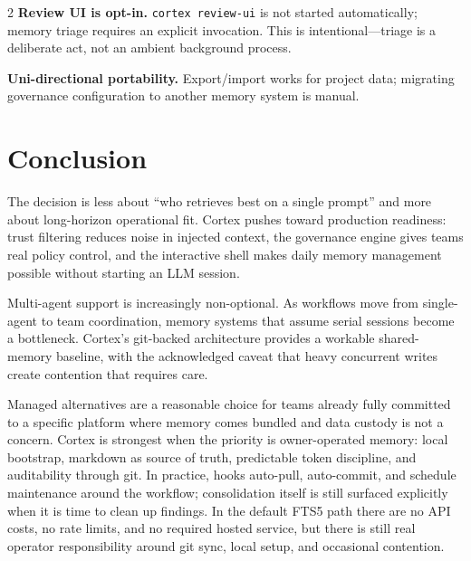 \documentclass[10pt]{article}
\begin{document}
\begin{multicols}{2}
\textbf{Review UI is opt-in.} \texttt{cortex review-ui} is not started automatically; memory triage requires an explicit invocation. This is intentional---triage is a deliberate act, not an ambient background process.

\textbf{Uni-directional portability.} Export/import works for project data; migrating governance configuration to another memory system is manual.

\section{Conclusion}
The decision is less about ``who retrieves best on a single prompt'' and more about long-horizon operational fit. Cortex pushes toward production readiness: trust filtering reduces noise in injected context, the governance engine gives teams real policy control, and the interactive shell makes daily memory management possible without starting an LLM session.

Multi-agent support is increasingly non-optional. As workflows move from single-agent to team coordination, memory systems that assume serial sessions become a bottleneck. Cortex's git-backed architecture provides a workable shared-memory baseline, with the acknowledged caveat that heavy concurrent writes create contention that requires care.

Managed alternatives are a reasonable choice for teams already fully committed to a specific platform where memory comes bundled and data custody is not a concern. Cortex is strongest when the priority is owner-operated memory: local bootstrap, markdown as source of truth, predictable token discipline, and auditability through git. In practice, hooks auto-pull, auto-commit, and schedule maintenance around the workflow; consolidation itself is still surfaced explicitly when it is time to clean up findings. In the default FTS5 path there are no API costs, no rate limits, and no required hosted service, but there is still real operator responsibility around git sync, local setup, and occasional contention.

\end{multicols}
\end{document}
